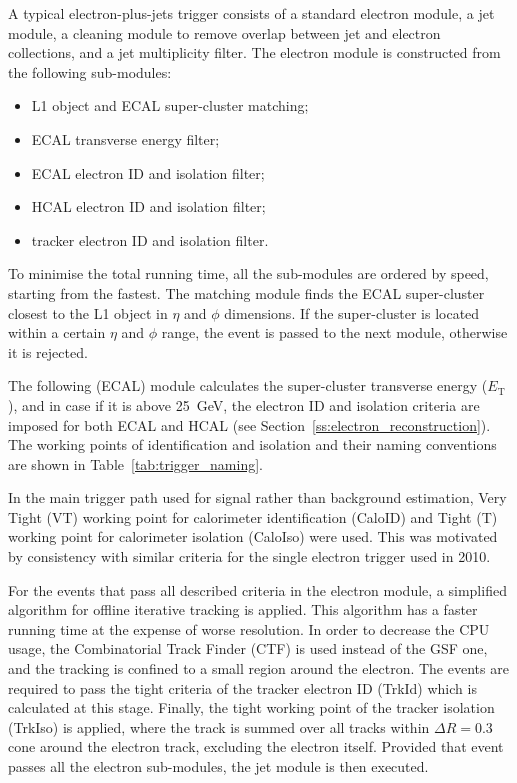 A typical electron-plus-jets trigger consists of a standard electron module, a jet module, a cleaning module to remove
overlap between jet and electron collections, and a jet multiplicity filter. The electron module is constructed from the
following sub-modules:

\begin{itemize}
  \item L1 object and ECAL super-cluster matching;
  \item ECAL transverse energy filter;
  \item ECAL electron ID and isolation filter;
  \item HCAL electron ID and isolation filter;
  \item tracker electron ID and isolation filter.
\end{itemize}

To minimise the total running time, all the sub-modules are ordered by speed, starting from the fastest. The matching
module finds the ECAL super-cluster closest to the L1 object in $\eta$ and $\phi$ dimensions. If the super-cluster is
located within a certain $\eta$ and $\phi$ range, the event is passed to the next module, otherwise it is rejected.

The following (ECAL) module calculates the super-cluster transverse energy ($E_\mathrm{T}$), and in case if it is above
\SI{25}{\GeV}, the electron ID and isolation criteria are imposed for both ECAL and HCAL (see
Section~\ref{ss:electron_reconstruction}). The working points of identification and isolation and their naming
conventions are shown in Table~\ref{tab:trigger_naming}.



In the main trigger path used for signal rather than background estimation, Very Tight (VT) working point for
calorimeter identification (CaloID) and Tight (T) working point for calorimeter isolation (CaloIso) were used. This was
motivated by consistency with similar criteria for the single electron trigger used in 2010.

For the events that pass all described criteria in the electron module, a simplified algorithm for offline iterative
tracking is applied. This algorithm has a faster running time at the expense of worse resolution. In order to decrease
the CPU usage, the Combinatorial Track Finder (CTF) \cite{CTF_tracking} is used instead of the GSF one, and the tracking
is confined to a small region around the electron. The events are required to pass the tight criteria of the tracker
electron ID (TrkId) which is calculated at this stage. Finally, the tight working point of the tracker isolation
(TrkIso) is applied, where the track \pt is summed over all tracks within $\Delta R = 0.3$ cone around the electron
track, excluding the electron itself. Provided that event passes all the electron sub-modules, the jet module is then
executed.

